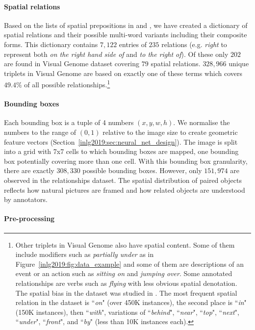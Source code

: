 \paragraph{Spatial relations}
Based on the lists of spatial prepositions in \citep{Landau:1996aa} and
\citep{herskovits1986language}, we have created a dictionary of spatial relations and their possible multi-word variants including their composite forms.
This dictionary contains $7,122$ entries of $235$ relations (e.g. \emph{right} to represent both \emph{on the right hand side of} and \emph{to the right of}). Of these only $202$ are found in Visual Genome dataset covering $79$ spatial relations.
$328,966$ unique triplets in Visual Genome are based on exactly one of these terms which covers $49.4\%$ of all possible relationships.\footnote{Other triplets in Visual Genome also have spatial content.
Some of them %
include modifiers such as \emph{partially under} as in Figure~\ref{inlg2019:fig:data_example} and some of them are descriptions of an event or an action such as \emph{sitting on} and \emph{jumping over}. Some annotated relationships are verbs such as \emph{flying} with less obvious spatial denotation.
The spatial bias in the dataset was studied in \cite{collell2018acquiring}.
The most frequent spatial relation in the dataset is ``\emph{on}" (over 450K instances), the second place is ``\emph{in}" (150K instances), %
then ``\emph{with}", variations of ``\emph{behind}", ``\emph{near}", ``\emph{top}", ``\emph{next}", ``\emph{under}", ``\emph{front}", and ``\emph{by}" (less than 10K instances each).}

\paragraph{Bounding boxes}
Each bounding box is a tuple of 4 numbers $(x, y, w, h)$. We normalise the numbers to the range of $(0,1)$ relative to the image size to create geometric feature vectors (Section~\ref{inlg2019:sec:neural_net_design}).
The image is split into a grid with 7x7 cells to which bounding boxes are mapped, one bounding box potentially covering more than one cell.
With this bounding box granularity, there are exactly $308,330$ possible bounding boxes. However, only $151,974$ are observed in the relationships dataset. The spatial distribution of paired objects reflects how natural pictures are framed and how related objects are understood by annotators.

\paragraph{Pre-processing}

